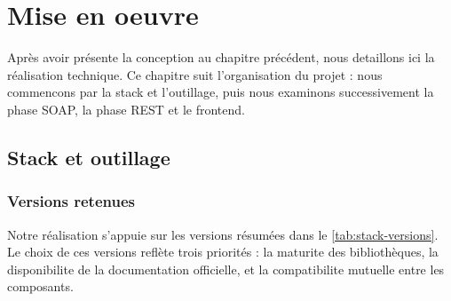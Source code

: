 \chapter{Mise en oeuvre}

Après avoir présente la conception au chapitre précédent, nous detaillons ici la réalisation technique. Ce chapitre suit l'organisation du projet : nous commencons par la stack et l'outillage, puis nous examinons successivement la phase SOAP, la phase REST et le frontend.

\section{Stack et outillage}

\subsection{Versions retenues}

Notre réalisation s'appuie sur les versions résumées dans le \autoref{tab:stack-versions}. Le choix de ces versions reflète trois priorités : la maturite des bibliothèques, la disponibilite de la documentation officielle, et la compatibilite mutuelle entre les composants.

